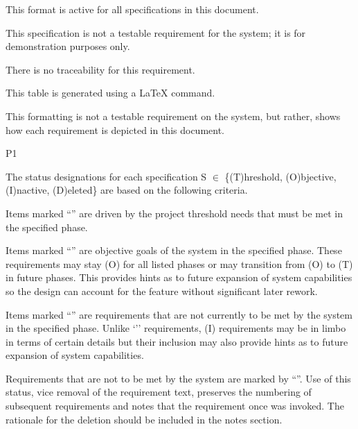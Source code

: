 {
	\item [All phases] This format is active for all specifications in this document.
}
{This specification is not a testable requirement for the system; it is for demonstration purposes only.}
{
	\item [N/A] There is no traceability for this requirement.
}
{
   \item This table is generated using a \LaTeX{} command.
   \item This formatting is not a testable requirement on the system, but rather, shows how each requirement is depicted in this document.
}
{P1}

The status designations for each specification S $\in$ \{(T)hreshold, (O)bjective, (I)nactive, (D)eleted\} are based on the following criteria.
\begin{my_description}
{
\item [\OneRqmtThreshold] Items marked ``\OneRqmtThreshold'' are driven by the project threshold needs that must be met in the specified phase.

\item [\OneRqmtObjective] Items marked ``\OneRqmtObjective'' are objective goals of the system in the specified phase. These requirements may stay (O) for all listed phases or may transition from (O) to (T) in future phases. This provides hints as to future expansion of system capabilities so the design can account for the feature without significant later rework.

\item [\OneRqmtInactive] Items marked ``\OneRqmtInactive'' are requirements that are not currently to be met by the system in the specified phase. Unlike `\OneRqmtObjective'' requirements, (I) requirements may be in limbo in terms of certain details but their inclusion may also provide hints as to future expansion of system capabilities. 

\item [\OneRqmtDeleted] Requirements that are not to be met by the system are marked by ``\OneRqmtDeleted''. Use of this status, vice removal of the requirement text, preserves the numbering of subsequent requirements and notes that the requirement once was invoked.
The rationale for the deletion should be included in the notes section. 
}
\end{my_description}

